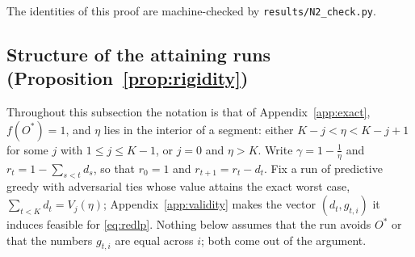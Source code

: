 The identities of this proof are machine-checked by
\texttt{results/N2\_check.py}.

\subsection{Structure of the attaining runs
(Proposition~\ref{prop:rigidity})}\label{app:rigidity}

Throughout this subsection the notation is that of Appendix~\ref{app:exact},
$f(O^{\ast})=1$, and $\eta$ lies in the interior of a segment: either
$K-j<\eta<K-j+1$ for some $j$ with $1\le j\le K-1$, or $j=0$ and $\eta>K$.
Write $\gamma=1-\tfrac1\eta$ and $r_t=1-\sum_{s<t}d_s$, so that $r_0=1$ and
$r_{t+1}=r_t-d_t$.  Fix a run of predictive greedy with adversarial ties whose
value attains the exact worst case, $\sum_{t<K}d_t=V_j(\eta)$;
Appendix~\ref{app:validity} makes the vector $(d_t,g_{t,i})$ it induces
feasible for \eqref{eq:redlp}.  Nothing below assumes that the run avoids
$O^{\ast}$ or that the numbers $g_{t,i}$ are equal across $i$; both come out
of the argument.

